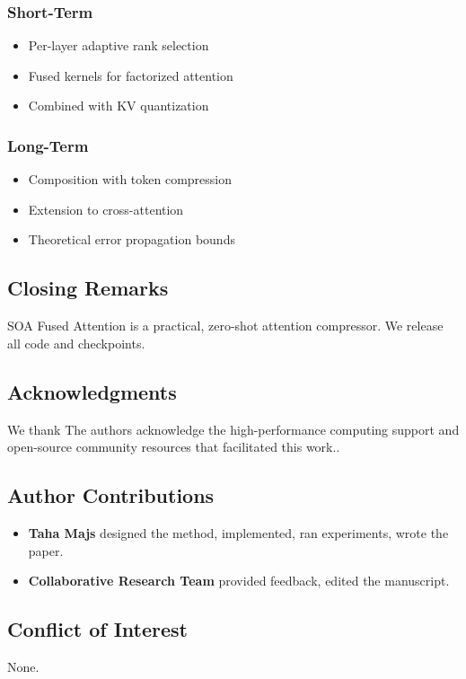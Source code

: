 \subsubsection{Short-Term}
\begin{itemize}
\item Per-layer adaptive rank selection
\item Fused kernels for factorized attention
\item Combined with KV quantization

\end{itemize}
\subsubsection{Long-Term}
\begin{itemize}
\item Composition with token compression
\item Extension to cross-attention
\item Theoretical error propagation bounds

\end{itemize}
\subsection{Closing Remarks}

SOA Fused Attention is a practical, zero-shot attention compressor. We 
release all code and checkpoints.

\subsection{Acknowledgments}

We thank The authors acknowledge the high-performance computing support and open-source community resources that facilitated this work..

\subsection{Author Contributions}

\begin{itemize}
\item \textbf{Taha Majs} designed the method, implemented, ran experiments, wrote
  the paper.
\item \textbf{Collaborative Research Team} provided feedback, edited the manuscript.

\end{itemize}
\subsection{Conflict of Interest}

None.

